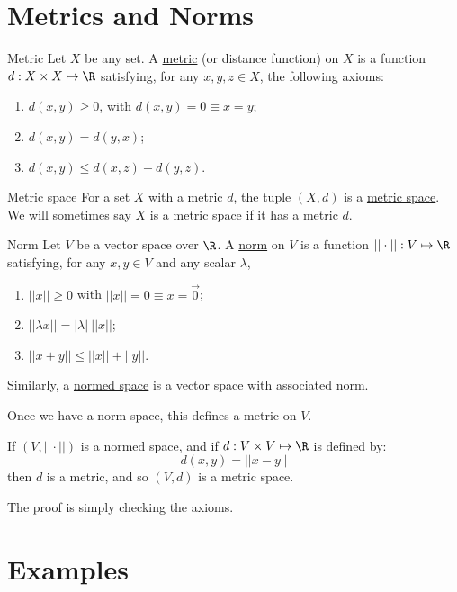\documentclass[../Main.tex]{subfiles}
\begin{document}
\section{Metrics and Norms}
\begin{definition}{Metric}
    Let $X$ be any set. A \underline{metric} (or distance function) on $X$ is a function $d : X \times X \mapsto \R$ satisfying, for any $x, y, z \in X$, the following axioms:
    \begin{enumerate}
        \item $d(x, y) \geq 0$, with $d(x, y) = 0 \equiv x = y$;
        \item $d(x, y) = d(y, x)$;
        \item $d(x, y) \leq d(x, z) + d(y, z)$.
    \end{enumerate}
\end{definition}
\begin{definition}{Metric space}
    For a set $X$ with a metric $d$, the tuple $(X, d)$ is a \underline{metric space}. We will sometimes say $X$ is a metric space if it has a metric $d$.
\end{definition}
\begin{definition}{Norm}
    Let $V$ be a vector space over $\R$. A \underline{norm} on $V$ is a function $||\cdot|| : V \mapsto \R$ satisfying, for any $x, y \in V$ and any scalar $\lambda$,
    \begin{enumerate}
        \item $||x|| \geq 0$ with $||x|| = 0 \equiv x = \vec{0}$;
        \item $||\lambda x|| = |\lambda|~||x||$;
        \item $||x + y|| \leq ||x|| + ||y||$.
    \end{enumerate}
\end{definition}
Similarly, a \underline{normed space} is a vector space with associated norm.

Once we have a norm space, this defines a metric on $V$.
\begin{proposition}
    If $(V, ||\cdot||)$ is a normed space, and if $d : V \times V \mapsto \R$ is defined by:
    \begin{equation*}
        d(x, y) = ||x - y||
    \end{equation*}
    then $d$ is a metric, and so $(V, d)$ is a metric space.
    \label{propNormIsMetric}
\end{proposition}
The proof is simply checking the axioms.
\section{Examples}
\end{document}
